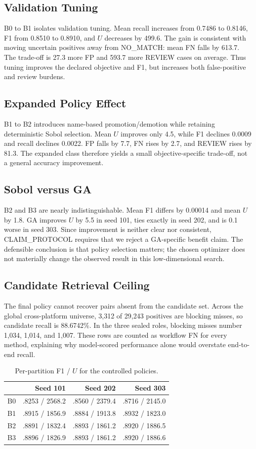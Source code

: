 \documentclass[conference]{IEEEtran}
\begin{document}
\subsection{Validation Tuning}
B0 to B1 isolates validation tuning. Mean recall increases from 0.7486 to 0.8146, F1 from 0.8510 to 0.8910, and $U$ decreases by 499.6. The gain is consistent with moving uncertain positives away from NO\_MATCH: mean FN falls by 613.7. The trade-off is 27.3 more FP and 593.7 more REVIEW cases on average. Thus tuning improves the declared objective and F1, but increases both false-positive and review burdens.

\subsection{Expanded Policy Effect}
B1 to B2 introduces name-based promotion/demotion while retaining deterministic Sobol selection. Mean $U$ improves only 4.5, while F1 declines 0.0009 and recall declines 0.0022. FP falls by 7.7, FN rises by 2.7, and REVIEW rises by 81.3. The expanded class therefore yields a small objective-specific trade-off, not a general accuracy improvement.

\subsection{Sobol versus GA}
B2 and B3 are nearly indistinguishable. Mean F1 differs by 0.00014 and mean $U$ by 1.8. GA improves $U$ by 5.5 in seed 101, ties exactly in seed 202, and is 0.1 worse in seed 303. Since improvement is neither clear nor consistent, CLAIM\_PROTOCOL requires that we reject a GA-specific benefit claim. The defensible conclusion is that policy selection matters; the chosen optimizer does not materially change the observed result in this low-dimensional search.

\subsection{Candidate Retrieval Ceiling}
The final policy cannot recover pairs absent from the candidate set. Across the global cross-platform universe, 3,312 of 29,243 positives are blocking misses, so candidate recall is 88.6742\%. In the three sealed roles, blocking misses number 1,034, 1,014, and 1,007. These rows are counted as workflow FN for every method, explaining why model-scored performance alone would overstate end-to-end recall.

\begin{table}[t]
\caption{Per-partition F1 / $U$ for the controlled policies.}
\centering
\begin{tabular}{lrrr}
\toprule
 & Seed 101 & Seed 202 & Seed 303\\
\midrule
B0 & .8253 / 2568.2 & .8560 / 2379.4 & .8716 / 2145.0\\
B1 & .8915 / 1856.9 & .8884 / 1913.8 & .8932 / 1823.0\\
B2 & .8891 / 1832.4 & .8893 / 1861.2 & .8920 / 1886.5\\
B3 & .8896 / 1826.9 & .8893 / 1861.2 & .8920 / 1886.6\\
\bottomrule
\end{tabular}
\end{table}
\end{document}
